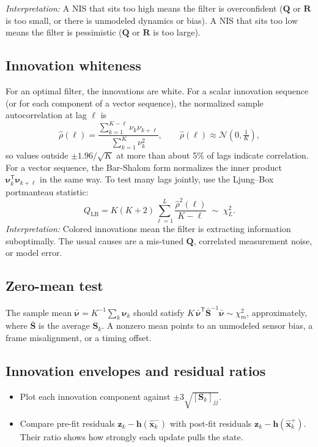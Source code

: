 \documentclass[11pt]{article}
\newcommand{\xhat}{\hat{\bm{x}}}
\newcommand{\nuv}{\bm{\nu}}
\newcommand{\Sm}{\bm{S}}
\newcommand{\Qm}{\bm{Q}}
\newcommand{\Rm}{\bm{R}}
\newcommand{\T}{^{\mathsf{T}}}
\newcommand{\chisq}[1]{\chi^2_{#1}}
\begin{document}
\emph{Interpretation:} A NIS that sits too high means the filter is overconfident
($\Qm$ or $\Rm$ is too small, or there is unmodeled dynamics or bias). A NIS that sits too
low means the filter is pessimistic ($\Qm$ or $\Rm$ is too large).

\subsection{Innovation whiteness}
For an optimal filter, the innovations are white. For a scalar innovation sequence (or for
each component of a vector sequence), the normalized sample autocorrelation at lag $\ell$ is
\begin{equation}
  \hat{\rho}(\ell) = \frac{\sum_{k=1}^{K-\ell} \nu_k \nu_{k+\ell}}
                          {\sum_{k=1}^{K} \nu_k^2},
  \qquad \hat{\rho}(\ell) \approx \mathcal{N}\!\left(0,\tfrac{1}{K}\right),
\end{equation}
so values outside $\pm 1.96/\sqrt{K}$ at more than about 5\% of lags indicate correlation.
For a vector sequence, the Bar-Shalom form normalizes the inner product
$\nuv_k\T\nuv_{k+\ell}$ in the same way. To test many lags jointly, use the Ljung--Box
portmanteau statistic:
\begin{equation}
  Q_{\mathrm{LB}} = K(K+2)\sum_{\ell=1}^{L}\frac{\hat{\rho}^2(\ell)}{K-\ell}
  \;\sim\; \chisq{L}.
\end{equation}
\emph{Interpretation:} Colored innovations mean the filter is extracting information
suboptimally. The usual causes are a mis-tuned $\Qm$, correlated measurement noise, or
model error.

\subsection{Zero-mean test}
The sample mean $\bar{\nuv} = K^{-1}\sum_k \nuv_k$ should satisfy
$K\,\bar{\nuv}\T \bar{\Sm}^{-1} \bar{\nuv} \sim \chisq{m}$, approximately, where
$\bar{\Sm}$ is the average $\Sm_k$. A nonzero mean points to an unmodeled sensor bias,
a frame misalignment, or a timing offset.

\subsection{Innovation envelopes and residual ratios}
\begin{itemize}
  \item Plot each innovation component against $\pm 3\sqrt{[\Sm_k]_{jj}}$.
  \item Compare pre-fit residuals $\bm{z}_k - \bm{h}(\xhat_k^-)$ with post-fit residuals
        $\bm{z}_k - \bm{h}(\xhat_k^+)$. Their ratio shows how strongly each update pulls
        the state.
\end{itemize}
\end{document}
